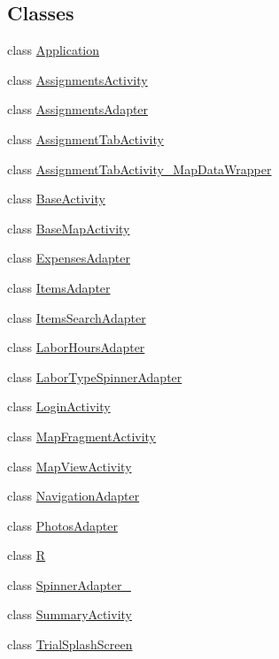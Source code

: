 \subsection*{Classes}
\begin{DoxyCompactItemize}
\item 
class \hyperlink{classfieldservice_1_1android_1_1_application}{Application}
\item 
class \hyperlink{classfieldservice_1_1android_1_1_assignments_activity}{Assignments\+Activity}
\item 
class \hyperlink{classfieldservice_1_1android_1_1_assignments_adapter}{Assignments\+Adapter}
\item 
class \hyperlink{classfieldservice_1_1android_1_1_assignment_tab_activity}{Assignment\+Tab\+Activity}
\item 
class \hyperlink{classfieldservice_1_1android_1_1_assignment_tab_activity___map_data_wrapper}{Assignment\+Tab\+Activity\+\_\+\+Map\+Data\+Wrapper}
\item 
class \hyperlink{classfieldservice_1_1android_1_1_base_activity}{Base\+Activity}
\item 
class \hyperlink{classfieldservice_1_1android_1_1_base_map_activity}{Base\+Map\+Activity}
\item 
class \hyperlink{classfieldservice_1_1android_1_1_expenses_adapter}{Expenses\+Adapter}
\item 
class \hyperlink{classfieldservice_1_1android_1_1_items_adapter}{Items\+Adapter}
\item 
class \hyperlink{classfieldservice_1_1android_1_1_items_search_adapter}{Items\+Search\+Adapter}
\item 
class \hyperlink{classfieldservice_1_1android_1_1_labor_hours_adapter}{Labor\+Hours\+Adapter}
\item 
class \hyperlink{classfieldservice_1_1android_1_1_labor_type_spinner_adapter}{Labor\+Type\+Spinner\+Adapter}
\item 
class \hyperlink{classfieldservice_1_1android_1_1_login_activity}{Login\+Activity}
\item 
class \hyperlink{classfieldservice_1_1android_1_1_map_fragment_activity}{Map\+Fragment\+Activity}
\item 
class \hyperlink{classfieldservice_1_1android_1_1_map_view_activity}{Map\+View\+Activity}
\item 
class \hyperlink{classfieldservice_1_1android_1_1_navigation_adapter}{Navigation\+Adapter}
\item 
class \hyperlink{classfieldservice_1_1android_1_1_photos_adapter}{Photos\+Adapter}
\item 
class \hyperlink{classfieldservice_1_1android_1_1_r}{R}
\item 
class \hyperlink{classfieldservice_1_1android_1_1_spinner_adapter__1}{Spinner\+Adapter\+\_}
\item 
class \hyperlink{classfieldservice_1_1android_1_1_summary_activity}{Summary\+Activity}
\item 
class \hyperlink{classfieldservice_1_1android_1_1_trial_splash_screen}{Trial\+Splash\+Screen}
\end{DoxyCompactItemize}
